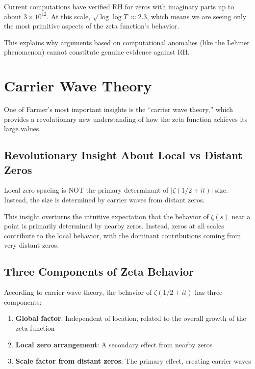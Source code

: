 \begin{remark}
Current computations have verified RH for zeros with imaginary parts up to about $3 \times 10^{12}$. At this scale, $\sqrt{\log \log T} \approx 2.3$, which means we are seeing only the most primitive aspects of the zeta function's behavior.
\end{remark}

This explains why arguments based on computational anomalies (like the Lehmer phenomenon) cannot constitute genuine evidence against RH.

\section{Carrier Wave Theory}
\label{sec:carrier_wave}

One of Farmer's most important insights is the ``carrier wave theory,'' which provides a revolutionary new understanding of how the zeta function achieves its large values.

\subsection{Revolutionary Insight About Local vs Distant Zeros}
\label{subsec:local_distant}

\begin{theorem}
Local zero spacing is NOT the primary determinant of $|\zeta(1/2 + it)|$ size. Instead, the size is determined by carrier waves from distant zeros.
\end{theorem}

This insight overturns the intuitive expectation that the behavior of $\zeta(s)$ near a point is primarily determined by nearby zeros. Instead, zeros at all scales contribute to the local behavior, with the dominant contributions coming from very distant zeros.

\subsection{Three Components of Zeta Behavior}
\label{subsec:three_components}

According to carrier wave theory, the behavior of $\zeta(1/2 + it)$ has three components:

\begin{enumerate}
\item \textbf{Global factor}: Independent of location, related to the overall growth of the zeta function
\item \textbf{Local zero arrangement}: A secondary effect from nearby zeros
\item \textbf{Scale factor from distant zeros}: The primary effect, creating carrier waves
\end{enumerate}

